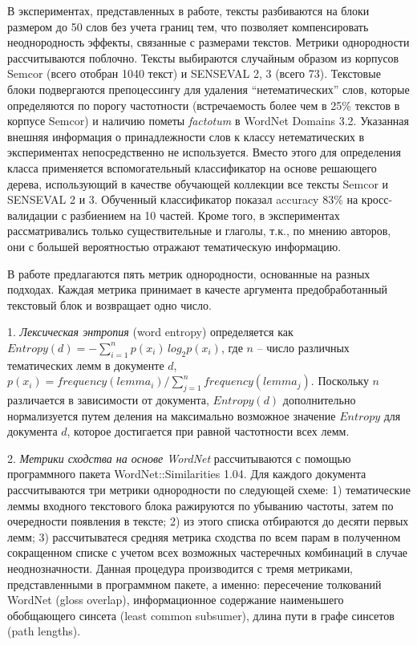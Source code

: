 В экспериментах, представленных в работе, тексты разбиваются на блоки размером до 50 слов без учета границ тем, что позволяет компенсировать неоднородность эффекты, связанные с размерами текстов. Метрики однородности рассчитываются поблочно. Тексты выбираются случайным образом из корпусов Semcor (всего отобран 1040 текст) и SENSEVAL 2, 3 (всего 73). Текстовые блоки подвергаются препоцессингу для удаления ``нетематических'' слов, которые определяются по порогу частотности (встречаемость более чем в 25\% текстов в корпусе Semcor) и наличию пометы \textit{factotum} в WordNet Domains 3.2. Указанная внешняя информация о принадлежности слов к классу нетематических в экспериментах непосредственно не используется. Вместо этого для определения класса применяется вспомогательный классификатор на основе решающего дерева, использующий в качестве обучающей коллекции все тексты Semcor и SENSEVAL 2 и 3. Обученный классификатор показал accuracy 83\% на кросс-валидации с разбиением на 10 частей. Кроме того, в экспериментах рассматривались только существительные и глаголы, т.к., по мнению авторов, они с большей вероятностью отражают тематическую информацию.

В работе предлагаются пять метрик однородности, основанные на разных подходах. Каждая метрика принимает в качесте аргумента предобработанный текстовый блок и возвращает одно число.

1. \textit{Лексическая энтропия} (word entropy) определяется как $Entropy(d) = -\sum_{i = 1}^{n}p(x_i)\,log_2 p(x_i)$, где $n$ -- число различных тематических лемм в документе $d$, $p(x_i) = frequency(lemma_i) / \sum_{j=1}^{n} frequency(lemma_j)$. Поскольку $n$ различается в зависимости от документа, $Entropy(d)$ дополнительно нормализуется путем деления на максимально возможное значение $Entropy$ для документа $d$, которое достигается при равной частотности всех лемм.

2. \textit{Метрики сходства на основе WordNet} рассчитываются с помощью программного пакета WordNet::Similarities 1.04. Для каждого документа рассчитываются три метрики однородности по следующей схеме: 1) тематические леммы входного текстового блока ражируются по убыванию частоты, затем по очередности появления в тексте; 2) из этого списка отбираются до десяти первых лемм; 3) рассчитыватеся средняя метрика сходства по всем парам в полученном сокращенном списке с учетом всех возможных частеречных комбинаций в случае неоднозначности. Данная процедура производится с тремя метриками, представленными в программном пакете, а именно: пересечение толкований WordNet (gloss overlap), информационное содержание наименьшего обобщающего синсета (least common subsumer), длина пути в графе синсетов (path lengths). 


